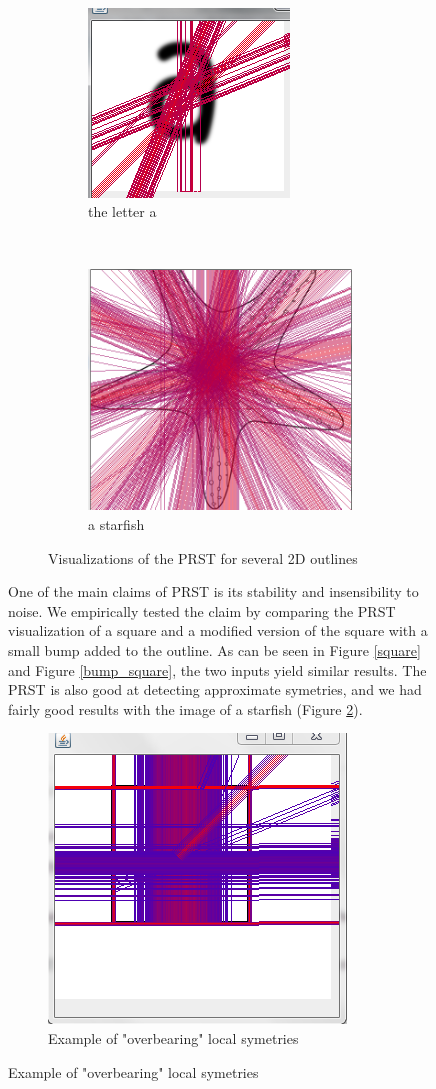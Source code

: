 \documentclass[10pt,a4paper]{article}			%
\begin{document}
\begin{figure}[h]
\begin{figure}[h]
       ~\\
	\begin{subfigure}{120 pt}
	 \includegraphics[height=120 pt]{img/sample_1000_seuil_07.png}
	 \caption{the letter a}
                \label{a}
                   \end{subfigure}
	~
	\begin{subfigure}{120 pt}
	 \includegraphics[height=120 pt]{img/n_32_sample2000_seuil06.png}
	 \caption{a starfish}
                \label{star}
              \end{subfigure}     
                \caption{Visualizations of the PRST for several 2D outlines}
	\label{visualization}
\end{figure}

One of the main claims of PRST is its stability and insensibility to noise. We empirically tested the claim by comparing the PRST visualization of a square and a modified version of the square with a small bump added to the outline. As can be seen in Figure \ref{square} and Figure \ref{bump_square}, the two inputs yield similar results. The PRST is also good at detecting approximate symetries, and we had fairly good results with the image of a starfish (Figure \ref{star}).

\begin{figure}[h]
\centering
 \includegraphics[scale = 0.7]{img/n_16_sample_1000.png}
 \caption{Example of "overbearing" local symetries}
 \label{thick_square}
\end{figure}


\end{figure}
\end{document}
